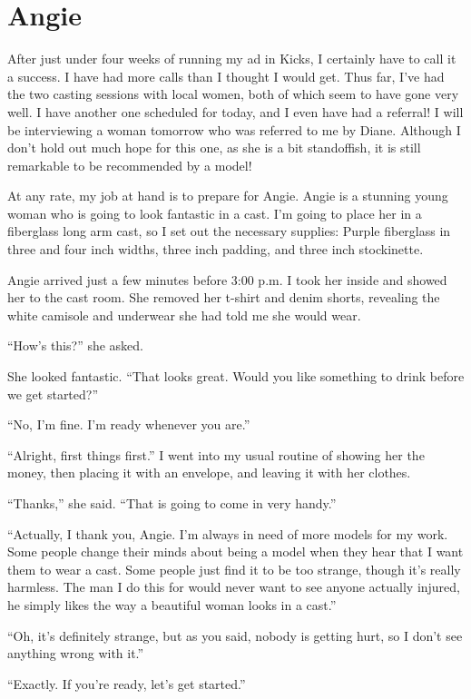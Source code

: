 \chapter{Angie}
After just under four weeks of running my ad in Kicks, I certainly have to call it a
success. I have had more calls than I thought I would get. Thus far, I've had the two casting
sessions with local women, both of which seem to have gone very well. I have another one
scheduled for today, and I even have had a referral! I will be interviewing a woman tomorrow who
was referred to me by Diane. Although I don't hold out much hope for this one, as she is a bit
standoffish, it is still remarkable to be recommended by a model!

At any rate, my job at hand is to prepare for Angie. Angie is a stunning young woman who is
going to look fantastic in a cast. I'm going to place her in a fiberglass long arm cast, so I
set out the necessary supplies: Purple fiberglass in three and four inch widths, three inch
padding, and three inch stockinette.

Angie arrived just a few minutes before 3:00 p.m. I took her inside and showed her to the cast
room. She removed her t-shirt and denim shorts, revealing the white camisole and underwear she
had told me she would wear.

``How's this?'' she asked.

She looked fantastic. ``That looks great. Would you like something to drink before we get
started?''

``No, I'm fine. I'm ready whenever you are.''

``Alright, first things first.'' I went into my usual routine of showing her the money, then
placing it with an envelope, and leaving it with her clothes.

``Thanks,'' she said. ``That is going to come in very handy.''

``Actually, I thank you, Angie. I'm always in need of more models for my work. Some people
change their minds about being a model when they hear that I want them to wear a cast. Some
people just find it to be too strange, though it's really harmless. The man I do this for would
never want to see anyone actually injured, he simply likes the way a beautiful woman looks in a
cast.''

``Oh, it's definitely strange, but as you said, nobody is getting hurt, so I don't see anything
wrong with it.''

``Exactly. If you're ready, let's get started.''


